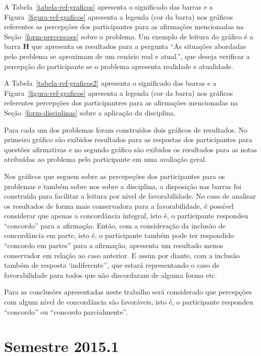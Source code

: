 A Tabela~\ref{tabela-ref-graficos} apresenta o significado das barras
e a Figura~\ref{figura-ref-graficos} apresenta a legenda (cor da barra)
nos gráficos referentes as percepções dos participantes para as
afirmações mencionadas na Seção~\ref{form-percepcoes} sobre
o problema.
Um exemplo de leitura do gráfico é a barra \textbf{H} que apresenta
os resultados para a pergunta ``As situações abordadas pelo problema
se aproximam de um cenário real e atual.'', que deseja verificar
a percepção do participante se o problema apresenta realidade
e atualidade.

A Tabela~\ref{tabela-ref-graficos2} apresenta o significado das barras
e a Figura~\ref{figura-ref-graficos} apresenta a legenda (cor da barra)
nos gráficos referentes percepções dos participantres para as
afirmações mencionadas na Seção~\ref{form-disciplinas} sobre
a aplicação da disciplina.

Para cada um dos problemas foram construídos dois gráficos de resultados.
No primeiro gráfico são exibidos resultados para as respostas
dos participantes para questões afirmativas e
no segundo gráfico são exibidos os resultados para as notas atribuídas
ao problema pelo participante em uma avaliação geral.

Nos gráficos que seguem sobre as percepeções dos participantes para os
problemas e também sobre nos sobre a disciplina, a disposição nas barras
foi construída para facilitar a leitura por nível de favorabilidade.
No caso de analisar os resultados de forma mais conservadora para
a favorabilidade, é possível considerar que apenas a concordância
integral, isto é, o participante respondeu ``concordo'' para
a afirmação.
Então, com a consideração da inclusão de concordância em parte,
isto é, o participante também pode ter respondido
``concordo em partes'' para a afirmação, apresenta um resultado
menos conservador em relação ao caso anterior.
E assim por diante, com a inclusão também de resposta `indiferente'', que
estará representando o caso de favorabilidade para todos que não
discordaram de alguma forma etc.

Para as conclusões apresentadas neste trabalho será considerado
que percepções com algum nível de concordância são favoráveis, isto é,
o participante respondeu ``concordo'' ou ``concordo parcialmente''.





\section{Semestre 2015.1}
\label{sec-sem-2015}

